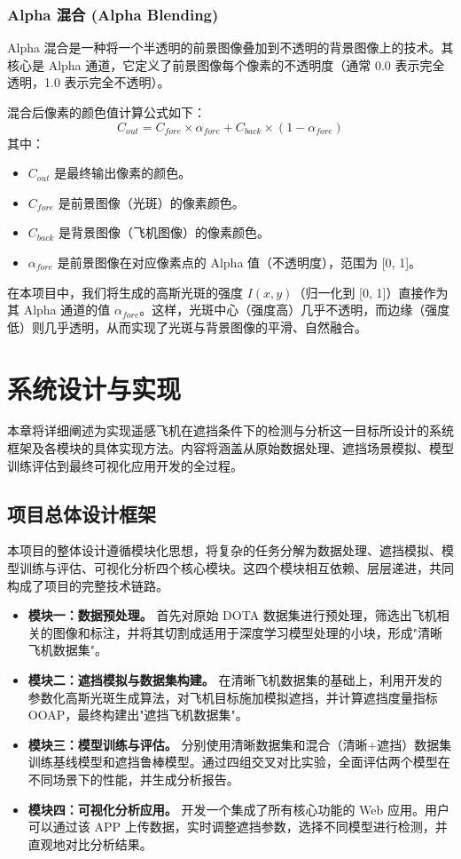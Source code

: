 \documentclass[12pt, a4paper]{report}
\begin{document}
\subsection{Alpha 混合 (Alpha Blending)}
Alpha 混合是一种将一个半透明的前景图像叠加到不透明的背景图像上的技术。其核心是 Alpha 通道，它定义了前景图像每个像素的不透明度（通常 0.0 表示完全透明，1.0 表示完全不透明）。

混合后像素的颜色值计算公式如下：
\begin{equation}
    C_{out} = C_{fore} \times \alpha_{fore} + C_{back} \times (1 - \alpha_{fore})
\end{equation}
其中：
\begin{itemize}
    \item $C_{out}$ 是最终输出像素的颜色。
    \item $C_{fore}$ 是前景图像（光斑）的像素颜色。
    \item $C_{back}$ 是背景图像（飞机图像）的像素颜色。
    \item $\alpha_{fore}$ 是前景图像在对应像素点的 Alpha 值（不透明度），范围为 [0, 1]。
\end{itemize}
在本项目中，我们将生成的高斯光斑的强度 $I(x, y)$（归一化到 [0, 1]）直接作为其 Alpha 通道的值 $\alpha_{fore}$。这样，光斑中心（强度高）几乎不透明，而边缘（强度低）则几乎透明，从而实现了光斑与背景图像的平滑、自然融合。

\chapter{系统设计与实现}
本章将详细阐述为实现遥感飞机在遮挡条件下的检测与分析这一目标所设计的系统框架及各模块的具体实现方法。内容将涵盖从原始数据处理、遮挡场景模拟、模型训练评估到最终可视化应用开发的全过程。

\section{项目总体设计框架}
本项目的整体设计遵循模块化思想，将复杂的任务分解为数据处理、遮挡模拟、模型训练与评估、可视化分析四个核心模块。这四个模块相互依赖、层层递进，共同构成了项目的完整技术链路。

\begin{itemize}
    \item \textbf{模块一：数据预处理。} 首先对原始 DOTA 数据集进行预处理，筛选出飞机相关的图像和标注，并将其切割成适用于深度学习模型处理的小块，形成"清晰飞机数据集"。
    \item \textbf{模块二：遮挡模拟与数据集构建。} 在清晰飞机数据集的基础上，利用开发的参数化高斯光斑生成算法，对飞机目标施加模拟遮挡，并计算遮挡度量指标 OOAP，最终构建出"遮挡飞机数据集"。
    \item \textbf{模块三：模型训练与评估。} 分别使用清晰数据集和混合（清晰+遮挡）数据集训练基线模型和遮挡鲁棒模型。通过四组交叉对比实验，全面评估两个模型在不同场景下的性能，并生成分析报告。
    \item \textbf{模块四：可视化分析应用。} 开发一个集成了所有核心功能的 Web 应用。用户可以通过该 APP 上传数据，实时调整遮挡参数，选择不同模型进行检测，并直观地对比分析结果。
\end{itemize}
\end{document}
